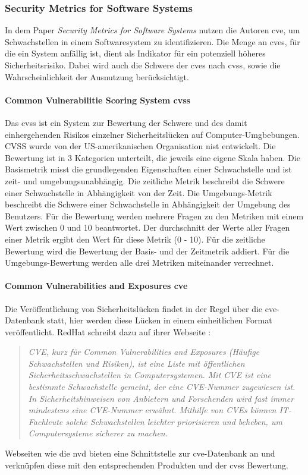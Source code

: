\documentclass[12pt, a4paper, ngerman]{article}
\begin{document}
\subsubsection{Security Metrics for Software Systems~\cite{Wang_Wang_Guo_Xia_2009}}

In dem Paper \emph{Security Metrics for Software Systems} nutzen die Autoren \ac{cve}, 
um Schwachstellen in einem Softwaresystem zu identifizieren. 
Die Menge an \ac{cve}s, für die ein System anfällig ist, dient als Indikator für ein potenziell höheres Sicherheitsrisiko.
Dabei wird auch die Schwere der \ac{cve}s nach \ac{cvss}, sowie die Wahrscheinlichkeit der Ausnutzung berücksichtigt.

\paragraph{Common Vulnerabilitie Scoring System \acs{cvss}}

Das \ac{cvss} ist ein System zur Bewertung der Schwere und 
des damit einhergehenden Risikos einzelner Sicherheitslücken auf Computer-Umgbebungen.
CVSS wurde von der US-amerikanischen Organisation \ac{nist} entwickelt. 
Die Bewertung ist in  3 Kategorien unterteilt, die jeweils eine eigene Skala haben.
Die Basismetrik misst die grundlegenden Eigenschaften einer Schwachstelle und ist zeit- und umgebungsunabhängig.
Die zeitliche Metrik beschreibt die Schwere einer Schwachstelle in Abhängigkeit von der Zeit.
Die Umgebungs-Metrik beschreibt die Schwere einer Schwachstelle in Abhängigkeit der Umgebung des Benutzers.
Für die Bewertung werden mehrere Fragen zu den Metriken mit einem Wert zwischen 0 und 10 beantwortet.
Der durchschnitt der Werte aller Fragen einer Metrik ergibt den Wert für diese Metrik (0 - 10).
Für die zeitliche Bewertung wird die Bewertung der Basis- und der Zeitmetrik addiert.
Für die Umgebungs-Bewertung werden alle drei Metriken miteinander verrechnet.

\paragraph{Common Vulnerabilities and Exposures \acs{cve}}

Die Veröffentlichung von Sicherheitslücken findet in der Regel über die \ac{cve}-Datenbank statt, 
hier werden diese Lücken in einem einheitlichen Format veröffentlicht.
RedHat schreibt dazu auf ihrer Webseite \cite{Redhat_CVE}: 
\begin{quote}
  \textit{
    CVE, kurz für Common Vulnerabilities and Exposures (Häufige Schwachstellen und Risiken), ist eine Liste mit öffentlichen Sicherheitsschwachstellen in Computersystemen. Mit CVE ist eine bestimmte Schwachstelle gemeint, der eine CVE-Nummer zugewiesen ist.
    In Sicherheitshinweisen von Anbietern und Forschenden wird fast immer mindestens eine CVE-Nummer erwähnt. Mithilfe von CVEs können IT-Fachleute solche Schwachstellen leichter priorisieren und beheben, um Computersysteme sicherer zu machen.
  } 
\end{quote}
Webseiten wie die \ac{nvd} bieten eine Schnittstelle zur \ac{cve}-Datenbank an und 
verknüpfen diese mit den entsprechenden Produkten und der \ac{cvss} Bewertung.
\end{document}
